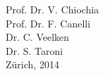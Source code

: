 \begin{titlepage}
\begin{center}
        \vspace{0.2cm}
        \Large Prof. Dr. V. Chiochia \\%
        \Large Prof. Dr. F. Canelli \\%
        \Large Dr. C. Veelken \\%
        \Large Dr. S. Taroni \\%
      \vspace{0.5cm}
       \vfill
       \large Z\"urich, 2014       
      \end{center}
      \vspace{1.0cm}
\cleardoublepage
    \end{titlepage}

